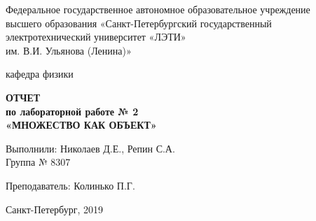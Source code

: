 \begin{titlepage}
  \begin{center}    
    Федеральное государственное автономное образовательное учреждение\\
    высшего образования «Санкт-Петербургский государственный\\
    электротехнический университет «ЛЭТИ»\\
    им. В.И. Ульянова (Ленина)»

    \vspace{0.5cm}
    
    кафедра физики

    \vfill

    \textbf{\large{
      ОТЧЕТ\\
      по лабораторной работе № 2 \\
      «МНОЖЕСТВО КАК ОБЪЕКТ»
    }}

    \vfill
\end{center}

Выполнили: Николаев Д.Е., Репин С.А.\\
Группа № 8307

\vspace{0.25cm}

Преподаватель: Колинько П.Г.
\bigskip

\vspace{0.5cm}
	
\hfill \break
\hfill \break
 
\begin{center}
  Санкт-Петербург, 2019
\end{center}

\end{titlepage}
